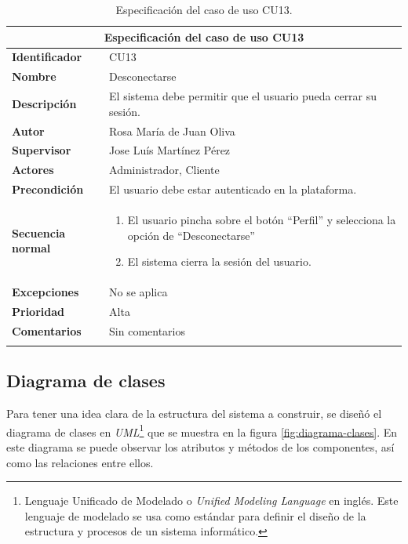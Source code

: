 \documentclass[pdftex,11pt,a4paper]{book}
\begin{document}
\begin{center}
\begin{longtable}{|m{}|m{11cm}|}
\hline
\multicolumn{2}{|c|}{\textbf{Especificación del caso de uso CU13}}\\
\hline 
\endhead

\textbf{Identificador} & CU13  
\\ \hline
\textbf{Nombre} & Desconectarse
\\ \hline
\textbf{Descripción} & El sistema debe permitir que el usuario pueda cerrar su sesión.
\\ \hline
\textbf{Autor} & Rosa María de Juan Oliva 
\\ \hline
\textbf{Supervisor} & Jose Luís Martínez Pérez  
\\ \hline
\textbf{Actores} & Administrador, Cliente
\\ \hline
\textbf{Precondición} & El usuario debe estar autenticado en la plataforma.
\\ \hline
\textbf{Secuencia normal} & 
\begin{enumerate}
\addtolength{\itemsep}{-3mm}
\item El usuario pincha sobre el botón “Perfil” y selecciona la opción de “Desconectarse”
\item El sistema cierra la sesión del usuario.
\end{enumerate}
\\ \hline
\textbf{Excepciones} & No se aplica
\\ \hline
\textbf{Prioridad} & Alta  
\\ \hline
\textbf{Comentarios} & Sin comentarios
\\ \hline

\caption{Especificación del caso de uso CU13.} \label{tablalarga:tablaCU13}
\end{longtable}
\end{center}


\vspace{5cm}

\subsection{Diagrama de clases}

Para tener una idea clara de la estructura del sistema a construir, se diseñó el diagrama de clases en \textit{UML}\footnote{Lenguaje Unificado de Modelado o \textit{Unified Modeling Language} en inglés. Este lenguaje de modelado se usa como estándar para definir el diseño de la estructura y procesos de un sistema informático.\cite{bib:uml}} que se muestra en la figura \ref{fig:diagrama-clases}. En este diagrama se puede observar los atributos y métodos de los componentes, así como las relaciones entre ellos.
\end{document}
